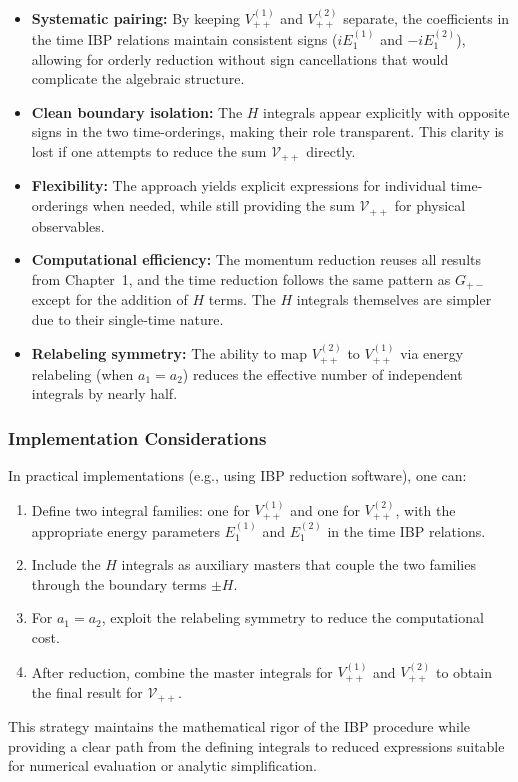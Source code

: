 \documentclass[a4paper,12pt]{article}
\begin{document}
\begin{itemize}
	\item \textbf{Systematic pairing:} By keeping $V_{++}^{(1)}$ and $V_{++}^{(2)}$ separate, the coefficients in the time IBP relations maintain consistent signs ($iE_1^{(1)}$ and $-iE_1^{(2)}$), allowing for orderly reduction without sign cancellations that would complicate the algebraic structure.

	\item \textbf{Clean boundary isolation:} The $H$ integrals appear explicitly with opposite signs in the two time-orderings, making their role transparent. This clarity is lost if one attempts to reduce the sum $\mathcal{V}_{++}$ directly.

	\item \textbf{Flexibility:} The approach yields explicit expressions for individual time-orderings when needed, while still providing the sum $\mathcal{V}_{++}$ for physical observables.

	\item \textbf{Computational efficiency:} The momentum reduction reuses all results from Chapter~1, and the time reduction follows the same pattern as $G_{+-}$ except for the addition of $H$ terms. The $H$ integrals themselves are simpler due to their single-time nature.

	\item \textbf{Relabeling symmetry:} The ability to map $V_{++}^{(2)}$ to $V_{++}^{(1)}$ via energy relabeling (when $a_1=a_2$) reduces the effective number of independent integrals by nearly half.
\end{itemize}

\subsubsection{Implementation Considerations}

In practical implementations (e.g., using IBP reduction software), one can:

\begin{enumerate}
	\item Define two integral families: one for $V_{++}^{(1)}$ and one for $V_{++}^{(2)}$, with the appropriate energy parameters $E_1^{(1)}$ and $E_1^{(2)}$ in the time IBP relations.

	\item Include the $H$ integrals as auxiliary masters that couple the two families through the boundary terms $\pm H$.

	\item For $a_1=a_2$, exploit the relabeling symmetry to reduce the computational cost.

	\item After reduction, combine the master integrals for $V_{++}^{(1)}$ and $V_{++}^{(2)}$ to obtain the final result for $\mathcal{V}_{++}$.
\end{enumerate}

This strategy maintains the mathematical rigor of the IBP procedure while providing a clear path from the defining integrals to reduced expressions suitable for numerical evaluation or analytic simplification.

\newpage


\end{document}

